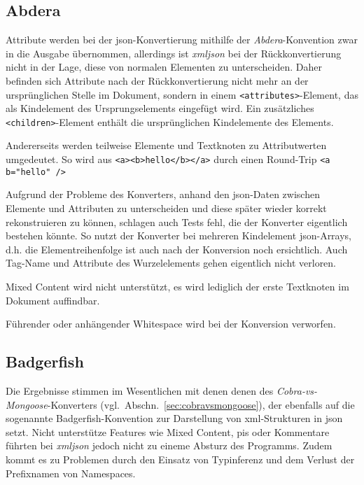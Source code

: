 \subsection{Abdera}
\label{sec:xmljson-abdera}

Attribute werden bei der \acrshort{json}-Konvertierung mithilfe der \emph{Abdera}-Konvention zwar in die Ausgabe übernommen, allerdings ist \emph{xmljson} bei der Rückkonvertierung nicht in der Lage, diese von normalen Elementen zu unterscheiden. Daher befinden sich Attribute nach der Rückkonvertierung nicht mehr an der ursprünglichen Stelle im Dokument, sondern in einem \texttt{<attributes>}-Element, das als Kindelement des Ursprungselements eingefügt wird. Ein zusätzliches \texttt{<children>}-Element enthält die ursprünglichen Kindelemente des Elements.

Andererseits werden teilweise Elemente und Textknoten zu Attributwerten umgedeutet. So wird aus \texttt{<a><b>hello</b></a>} durch einen Round-Trip \texttt{<a b="hello" />}

Aufgrund der Probleme des Konverters, anhand den \acrshort{json}-Daten zwischen Elemente und Attributen zu unterscheiden und diese später wieder korrekt rekonstruieren zu können, schlagen auch Tests fehl, die der Konverter eigentlich bestehen könnte. So nutzt der Konverter bei mehreren Kindelement \acrshort{json}-Arrays, d.h. die Elementreihenfolge ist auch nach der Konversion noch ersichtlich.
 Auch Tag-Name und Attribute des Wurzelelements gehen eigentlich nicht verloren.

Mixed Content wird nicht unterstützt, es wird lediglich der erste Textknoten im Dokument auffindbar.

Führender oder anhängender Whitespace wird bei der Konversion verworfen.

\subsection{Badgerfish}
\label{sec:xmljson-badgerfish}

Die Ergebnisse stimmen im Wesentlichen mit denen  denen des \emph{Cobra-vs-Mongoose}-Konverters (vgl.~Abschn.~\ref{sec:cobravsmongoose}), der ebenfalls auf die sogenannte Badgerfish-Konvention zur Darstellung von \acrshort{xml}-Strukturen in \acrshort{json} setzt. Nicht unterstütze Features wie Mixed Content, \glspl{pi} oder Kommentare führten bei \emph{xmljson} jedoch nicht zu eineme Absturz des Programms. Zudem kommt es zu Problemen durch den Einsatz von Typinferenz und dem Verlust der Prefixnamen von Namespaces.

